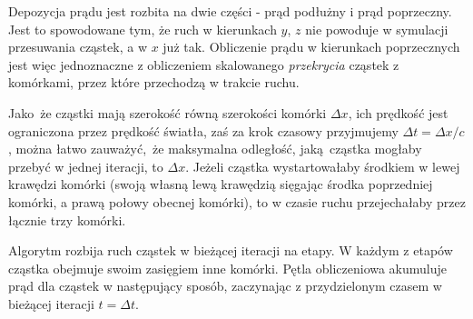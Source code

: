     Depozycja prądu jest rozbita na dwie części - prąd podłużny i prąd
    poprzeczny. Jest to spowodowane tym, że ruch w kierunkach $y$, $z$ nie
    powoduje w symulacji przesuwania cząstek, a w $x$ już tak. Obliczenie prądu
    w kierunkach poprzecznych jest więc jednoznaczne z obliczeniem skalowanego
    \emph{przekrycia} cząstek z komórkami, przez które przechodzą w trakcie
    ruchu.

    Jako że cząstki mają szerokość równą szerokości komórki $\Delta x$, ich
    prędkość jest ograniczona przez prędkość światła, zaś za krok czasowy
    przyjmujemy $\Delta t = \Delta x/c$, można łatwo zauważyć, że maksymalna
    odległość, jaką cząstka mogłaby przebyć w jednej iteracji, to $\Delta x$.
    Jeżeli cząstka wystartowałaby środkiem w lewej krawędzi komórki (swoją
    własną lewą krawędzią sięgając środka poprzedniej komórki, a prawą połowy
    obecnej komórki), to w czasie ruchu przejechałaby 
    przez łącznie trzy komórki. 

    Algorytm rozbija ruch cząstek w bieżącej iteracji na etapy. W każdym z
    etapów cząstka obejmuje swoim zasięgiem inne komórki. Pętla obliczeniowa
    akumuluje prąd dla cząstek w następujący sposób, zaczynając z przydzielonym
    czasem w bieżącej iteracji $t = \Delta t$.

